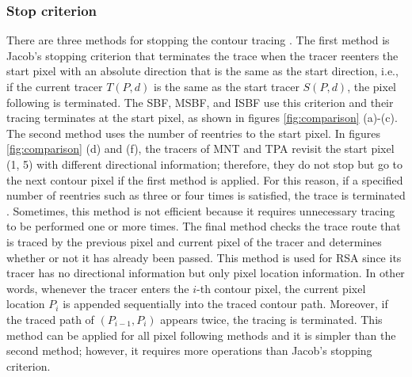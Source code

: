 \subsubsection{Stop criterion}
There are three methods for stopping the contour tracing \cite{Ghuneim2000Contour}. The first method is Jacob's stopping criterion \cite{Ghuneim2000Contour} that terminates the trace when the tracer reenters the start pixel with an absolute direction that is the same as the start direction, i.e., if the current tracer $T(P,d)$ is the same as the start tracer $S(P,d)$, the pixel following is terminated. The SBF, MSBF, and ISBF use this criterion and their tracing terminates at the start pixel, as shown in figures \ref{fig:comparison} (a)-(c). The second method uses the number of reentries to the start pixel. In figures \ref{fig:comparison} (d) and (f), the tracers of MNT and TPA revisit the start pixel (1, 5) with different directional information; therefore, they do not stop but go to the next contour pixel if the first method is applied. For this reason, if a specified number of reentries such as three or four times is satisfied, the trace is terminated \cite{Ghuneim2000Contour}. Sometimes, this method is not efficient because it requires unnecessary tracing to be performed one or more times. The final method checks the trace route that is traced by the previous pixel and current pixel of the tracer and determines whether or not it has already been passed. This method is used for RSA \cite{Ghuneim2000Contour,Mirante1982Radial} since its tracer has no directional information but only pixel location information. In other words, whenever the tracer enters the $i$-th contour pixel, the current pixel location $P_i$ is appended sequentially into the traced contour path. Moreover, if the traced path of $(P_{i-1}, P_i)$ appears twice, the tracing is terminated. This method can be applied for all pixel following methods and it is simpler than the second method; however, it requires more operations than Jacob's stopping criterion.

